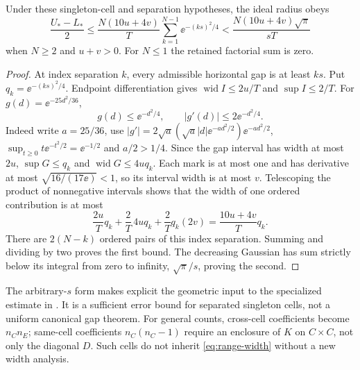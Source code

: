 \begin{theorem}\label{thm:cell-ranges}
Under these singleton-cell and separation hypotheses, the ideal radius obeys
\begin{equation}\label{eq:range-width}
 \frac{U_*-L_*}{2}
   \le\frac{N(10u+4v)}{T}\sum_{k=1}^{N-1}\ee^{-(ks)^2/4}
   <\frac{N(10u+4v)\sqrt\pi}{sT}
\end{equation}
when $N\ge2$ and $u+v>0$. For $N\le1$ the retained factorial sum is zero.
\end{theorem}
\begin{proof}
At index separation $k$, every admissible horizontal gap is at least
$ks$. Put $q_k=\ee^{-(ks)^2/4}$. Endpoint differentiation gives
$\operatorname{wid}I\le2u/T$ and $\sup I\le2/T$.
For $g(d)=\ee^{-25d^2/36}$,
\[
 g(d)\le\ee^{-d^2/4},\qquad |g'(d)|\le2\ee^{-d^2/4}.
\]
Indeed write $a=25/36$, use
$|g'|=2\sqrt a(\sqrt a|d|\ee^{-ad^2/2})\ee^{-ad^2/2}$,
$\sup_{t\ge0}t\ee^{-t^2/2}=\ee^{-1/2}$ and $a/2>1/4$.
Since the gap interval has width at most $2u$,
$\sup G\le q_k$ and $\operatorname{wid}G\le4u q_k$.
Each mark is at most one and has derivative at most
$\sqrt{16/(17\ee)}<1$, so its interval width is at most $v$.
Telescoping the product of nonnegative intervals shows that the width
of one ordered contribution is at most
\[
 \frac{2u}{T}q_k+\frac2T\,4u q_k+\frac2Tq_k(2v)
       =\frac{10u+4v}{T}q_k.
\]
There are $2(N-k)$ ordered pairs of this index separation. Summing
and dividing by two proves the first bound. The decreasing Gaussian
has sum strictly below its integral from zero to infinity,
$\sqrt\pi/s$, proving the second.
\end{proof}
The arbitrary-$s$ form makes explicit the geometric input to the
specialized estimate in \cite{OCCellRanges}. It is a sufficient error
bound for separated singleton cells, not a uniform canonical gap theorem.
For general counts, cross-cell coefficients become $n_Cn_E$;
same-cell coefficients $n_C(n_C-1)$ require an enclosure of $K$ on
$C\times C$, not only the diagonal $D$. Such cells do not inherit
\eqref{eq:range-width} without a new width analysis.

